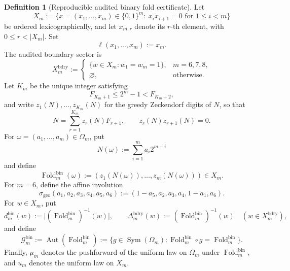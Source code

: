 \documentclass[12pt,a4paper]{article}
\theoremstyle{plain}
\theoremstyle{definition}
\newtheorem{definition}[theorem]{Definition}
\numberwithin{equation}{section}
\DeclareMathOperator{\Aut}{Aut}
\DeclareMathOperator{\Sym}{Sym}
\newcommand{\card}[1]{\lvert #1\rvert}
\newcommand{\Fold}{\operatorname{Fold}}
\begin{document}
\begin{definition}[Reproducible audited binary fold certificate]\label{def:audited-binary-fold-certificate}
Let
\[
X_m:=\{x=(x_1,\ldots,x_m)\in\{0,1\}^m:\ x_i x_{i+1}=0\text{ for }1\le i<m\}
\]
be ordered lexicographically, and let \(x_{m,r}\) denote its \(r\)-th element, with \(0\le r<|X_m|\).
Set
\[
\ell(x_1,\ldots,x_m):=x_m.
\]
The audited boundary sector is
\[
X_m^{\mathrm{bdry}}:=
\begin{cases}
\{w\in X_m:w_1=w_m=1\}, & m=6,7,8,\\
\varnothing, & \text{otherwise}.
\end{cases}
\]
Let \(K_m\) be the unique integer satisfying
\[
F_{K_m+1}\le 2^m-1<F_{K_m+2},
\]
and write \(z_1(N),\ldots,z_{K_m}(N)\) for the greedy Zeckendorf digits of \(N\), so that
\[
N=\sum_{r=1}^{K_m}z_r(N)F_{r+1},
\qquad z_r(N)z_{r+1}(N)=0.
\]
For \(\omega=(a_1,\ldots,a_m)\in\Omega_m\), put
\[
N(\omega):=\sum_{i=1}^{m}a_i2^{m-i}
\]
and define
\[
\Fold_m^{\mathrm{bin}}(\omega):=(z_1(N(\omega)),\ldots,z_m(N(\omega)))\in X_m.
\]
For \(m=6\), define the affine involution
\[
\sigma_{\mathrm{geo}}(a_1,a_2,a_3,a_4,a_5,a_6)
:=(1-a_5,a_2,a_3,a_4,1-a_1,a_6).
\]
For \(w\in X_m\), put
\[
d_m^{\mathrm{bin}}(w):=\card{(\Fold_m^{\mathrm{bin}})^{-1}(w)},
\qquad
\Delta_m^{\mathrm{bdry}}(w):=(\Fold_m^{\mathrm{bin}})^{-1}(w)
\quad(w\in X_m^{\mathrm{bdry}}),
\]
and define
\[
\mathcal G_m^{\mathrm{bin}}:=\Aut(\Fold_m^{\mathrm{bin}})
:=\{g\in\Sym(\Omega_m):\Fold_m^{\mathrm{bin}}\circ g=\Fold_m^{\mathrm{bin}}\}.
\]
Finally, \(\mu_m\) denotes the pushforward of the uniform law on \(\Omega_m\) under \(\Fold_m^{\mathrm{bin}}\), and \(u_m\) denotes the uniform law on \(X_m\).
\end{definition}
\end{document}
